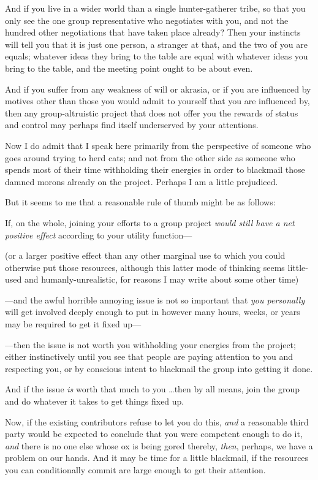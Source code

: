{
 And if you live in a wider world than a single hunter-gatherer
tribe, so that you only see the one group representative who negotiates
with you, and not the hundred other negotiations that have taken place
already? Then your instincts will tell you that it is just one person,
a stranger at that, and the two of you are equals; whatever ideas they
bring to the table are equal with whatever ideas you bring to the
table, and the meeting point ought to be about even.}

{
 And if you suffer from any weakness of will or akrasia, or if you
are influenced by motives other than those you would admit to yourself
that you are influenced by, then any group-altruistic project that does
not offer you the rewards of status and control may perhaps find itself
underserved by your attentions.}

{
 Now I do admit that I speak here primarily from the perspective of
someone who goes around trying to herd cats; and not from the other
side as someone who spends most of their time withholding their
energies in order to blackmail those damned morons already on the
project. Perhaps I am a little prejudiced.}

{
 But it seems to me that a reasonable rule of thumb might be as
follows:}

{
 If, on the whole, joining your efforts to a group project
\textit{would still have a net positive effect} according to your
utility function---}

{
 (or a larger positive effect than any other marginal use to which
you could otherwise put those resources, although this latter mode of
thinking seems little-used and humanly-unrealistic, for reasons I may
write about some other time)}

{
 {}---and the awful horrible annoying issue is not so important
that \textit{you personally} will get involved deeply enough to put in
however many hours, weeks, or years may be required to get it fixed
up---}

{
 {}---then the issue is not worth you withholding your energies
from the project; either instinctively until you see that people are
paying attention to you and respecting you, or by conscious intent to
blackmail the group into getting it done.}

{
 And if the issue \textit{is} worth that much to you \ldots then by
all means, join the group and do whatever it takes to get things fixed
up.}

{
 Now, if the existing contributors refuse to let you do this,
\textit{and} a reasonable third party would be expected to conclude
that you were competent enough to do it, \textit{and} there is no one
else whose ox is being gored thereby, \textit{then}, perhaps, we have a
problem on our hands. And it may be time for a little blackmail, if the
resources you can conditionally commit are large enough to get their
attention.}

